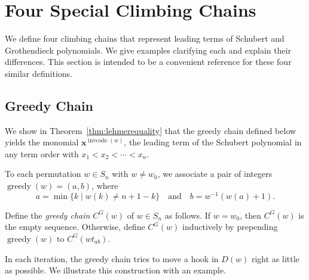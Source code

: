 \documentclass[ALCO]{cedram}
\DeclareMathOperator{\greedy}{\mathrm{greedy}}
\DeclareMathOperator{\cc}{\mathrm{invcode}}
\newcommand{\CG}{C^G}
\begin{document}
\section{Four Special Climbing Chains}
\label{sec:allchaindefs}

We define four climbing chains that represent leading terms of Schubert and Grothendieck polynomials. We give examples clarifying each and explain their differences. This section is intended to be a convenient reference for these four similar definitions.

\subsection{Greedy Chain}


We show in Theorem~\ref{thm:lehmerequality} that the greedy chain defined below yields the monomial $\bm{x}^{\cc(w)}$, the leading term of the Schubert polynomial in any term order with $x_1<x_2<\cdots<x_n$.
\begin{definition}
	To each permutation $w\in S_n$ with $w\neq w_0$, we associate a pair of integers $\greedy(w)=(a,b)$, where
	\[a=\min\{k\mid w(k)\neq n+1-k\}\quad \mbox{and}\quad b=w^{-1}(w(a)+1).\] 
\end{definition}

\begin{definition}
	\label{def:greedy}
	Define the \emph{greedy chain} $\CG(w)$ of $w\in S_n$ as follows. If $w=w_0$, then $\CG(w)$ is the empty sequence. Otherwise, define $\CG(w)$ inductively by prepending $\greedy(w)$ to $\CG(wt_{ab})$.
\end{definition}

In each iteration, the greedy chain tries to move a hook in $D(w)$ right as little as possible. We illustrate this construction with an example.
\end{document}
